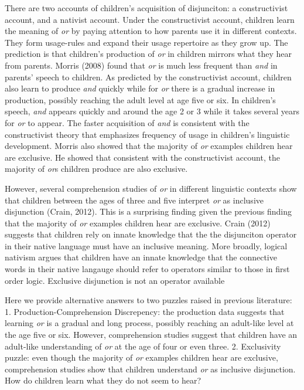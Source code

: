 \documentclass[10pt, letterpaper]{article}
\begin{document}
There are two accounts of children's acquisition of disjunciton: a
constructivist account, and a nativist account. Under the constructivist
account, children learn the meaning of \emph{or} by paying attention to
how parents use it in different contexts. They form usage-rules and
expand their usage repertoire as they grow up. The prediction is that
children's production of \emph{or} in children mirrors what they hear
from parents. Morris (2008) found that \emph{or} is much less frequent
than \emph{and} in parents' speech to children. As predicted by the
constructivist account, children also learn to produce \emph{and}
quickly while for \emph{or} there is a gradual increase in production,
possibly reaching the adult level at age five or six. In children's
speech, \emph{and} appears quickly and around the age 2 or 3 while it
takes several years for \emph{or} to appear. The faster acquisition of
\emph{and} is consistent with the constructivist theory that emphasizes
frequency of usage in children's linguistic development. Morris also
showed that the majority of \emph{or} examples children hear are
exclusive. He showed that consistent with the constructivist account,
the majority of \emph{or}s children produce are also exclusive.

However, several comprehension studies of \emph{or} in different
linguistic contexts show that children between the ages of three and
five interpret \emph{or} as inclusive disjunction (Crain, 2012). This is
a surprising finding given the previous finding that the majority of
\emph{or} examples children hear are exclusive. Crain (2012) suggests
that children rely on innate knowledge that the the disjunciton operator
in their native language must have an inclusive meaning. More broadly,
logical nativism argues that children have an innate knowledge that the
connective words in their native langauge should refer to operators
similar to those in first order logic. Exclusive disjunction is not an
operator available

Here we provide alternative answers to two puzzles raised in previous
literature: 1. Production-Comprehension Discrepency: the production data
suggests that learning \emph{or} is a gradual and long process, possibly
reaching an adult-like level at the age five or six. However,
comprehension studies suggest that children have an adult-like
understanding of \emph{or} at the age of four or even three. 2.
Exclusivity puzzle: even though the majority of \emph{or} examples
children hear are exclusive, comprehension studies show that children
understand \emph{or} as inclusive disjunction. How do children learn
what they do not seem to hear?
\end{document}
